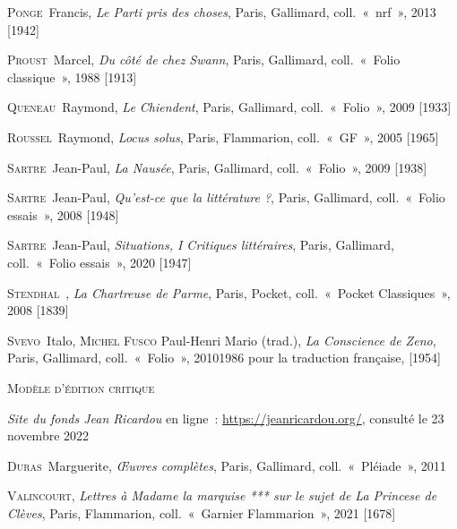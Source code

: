 \documentclass[12pt, a4paper]{article}
\begin{document}
    \textsc{Ponge}~Francis, \textit{Le Parti pris des choses}, Paris, Gallimard, coll.~«~nrf~», 2013 [1942]\par 
    \textsc{Proust}~Marcel, \textit{Du côté de chez Swann}, Paris, Gallimard, coll.~«~Folio classique~», 1988 [1913]\par 
    \textsc{Queneau}~Raymond, \textit{Le Chiendent}, Paris, Gallimard, coll.~«~Folio~», 2009 [1933]\par 
    \textsc{Roussel}~Raymond, \textit{Locus solus}, Paris, Flammarion, coll.~«~GF~», 2005 [1965]\par 
    \textsc{Sartre}~Jean-Paul, \textit{La Nausée}, Paris, Gallimard, coll.~«~Folio~», 2009 [1938]\par 
    \textsc{Sartre}~Jean-Paul, \textit{Qu'est-ce que la littérature ?}, Paris, Gallimard, coll.~«~Folio essais~», 2008 [1948]\par 
    \textsc{Sartre}~Jean-Paul, \textit{Situations, I Critiques littéraires}, Paris, Gallimard, coll.~«~Folio essais~», 2020 [1947]\par 
    \textsc{Stendhal}~, \textit{La Chartreuse de Parme}, Paris, Pocket, coll.~«~Pocket Classiques~», 2008 [1839]\par 
    \textsc{Svevo}~Italo, \textsc{Michel Fusco} Paul-Henri Mario (trad.), \textit{La Conscience de Zeno}, Paris, Gallimard, coll.~«~Folio~», 20101986 pour la traduction française,  [1954]\par 
    
        \vspace*{2cm}
        \setlength{\parindent}{0cm}
{\large\textsc{Modèle d'édition critique}}
        \vspace*{1cm}
        \setlength{\parindent}{25pt}
        
        
        

        
        
        \textit{Site du fonds Jean Ricardou} en ligne~: \hyperlink{https://jeanricardou.org/}{https://jeanricardou.org/}, consulté le 23 novembre 2022\par

    \textsc{Duras}~Marguerite, \textit{Œuvres complètes}, Paris, Gallimard, coll.~«~Pléiade~», 2011\par 
    \textsc{Valincourt}, \textit{Lettres à Madame la marquise *** sur le sujet de La Princese de Clèves}, Paris, Flammarion, coll.~«~Garnier Flammarion~», 2021 [1678]\par 
        
          
\newpage
\end{document}
